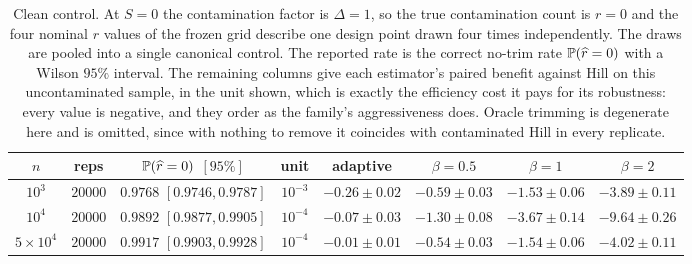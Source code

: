 \begin{table}[H]
\centering
\footnotesize
\setlength{\tabcolsep}{4pt}
\begin{tabular}{cccccccc}
\toprule
$n$ & reps & $\mathbb{P}(\widehat r=0)$ $[95\%]$ & unit & adaptive & $\beta{=}0.5$ & $\beta{=}1$ & $\beta{=}2$\\
\midrule
$10^3$ & $20000$ & $0.9768$ $[0.9746,0.9787]$ & $10^{-3}$ & $-0.26\pm0.02$ & $-0.59\pm0.03$ & $-1.53\pm0.06$ & $-3.89\pm0.11$\\
$10^4$ & $20000$ & $0.9892$ $[0.9877,0.9905]$ & $10^{-4}$ & $-0.07\pm0.03$ & $-1.30\pm0.08$ & $-3.67\pm0.14$ & $-9.64\pm0.26$\\
$5{\times}10^4$ & $20000$ & $0.9917$ $[0.9903,0.9928]$ & $10^{-4}$ & $-0.01\pm0.01$ & $-0.54\pm0.03$ & $-1.54\pm0.06$ & $-4.02\pm0.11$\\
\bottomrule
\end{tabular}
\caption{Clean control.  At $S=0$ the contamination factor is $\Delta=1$, so the true contamination count is $r=0$ and the four nominal $r$ values of the frozen grid describe one design point drawn four times independently.  The draws are pooled into a single canonical control.  The reported rate is the correct no-trim rate $\mathbb{P}(\widehat r=0)$ with a Wilson $95\%$ interval.  The remaining columns give each estimator's paired benefit against Hill on this uncontaminated sample, in the unit shown, which is exactly the efficiency cost it pays for its robustness: every value is negative, and they order as the family's aggressiveness does.  Oracle trimming is degenerate here and is omitted, since with nothing to remove it coincides with contaminated Hill in every replicate.}
\label{tab:clean-cell}
\end{table}
